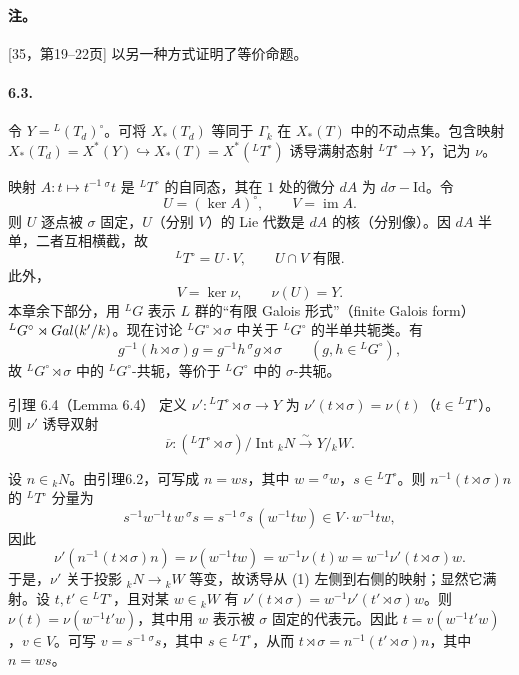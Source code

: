 \paragraph*{注。} [35，第19--22页] 以另一种方式证明了等价命题。

\paragraph*{6.3.} 令 $Y={}^L(T_d)^\circ$。可将 $X_*(T_d)$ 等同于 $\Gamma_k$ 在 $X_*(T)$ 中的不动点集。包含映射 $X_*(T_d)=X^*(Y)\hookrightarrow X_*(T)=X^*({}^LT^\circ)$ 诱导满射态射 ${}^LT^\circ\to Y$，记为 $\nu$。

映射 $A:t\mapsto t^{-1}\,{}^\sigma t$ 是 ${}^LT^\circ$ 的自同态，其在 $1$ 处的微分 $dA$ 为 $d\sigma-\mathrm{Id}$。令
\begin{equation}
 U=(\ker A)^\circ,\qquad V=\operatorname{im}A.\tag{1}
\end{equation}
则 $U$ 逐点被 $\sigma$ 固定，$U$（分别 $V$）的 Lie 代数是 $dA$ 的核（分别像）。因 $dA$ 半单，二者互相横截，故
\begin{equation}
 {}^LT^\circ=U\cdot V,\qquad U\cap V\text{ 有限}.\tag{2}
\end{equation}
此外，
\begin{equation}
 V=\ker\nu,\qquad\nu(U)=Y.\tag{3}
\end{equation}
本章余下部分，用 ${}^LG$ 表示 $L$ 群的“有限 Galois 形式”（finite Galois form）${}^LG^\circ\rtimes Gal(k'/k)$。现在讨论 ${}^LG^\circ\rtimes\sigma$ 中关于 ${}^LG^\circ$ 的半单共轭类。有
\begin{equation}
 g^{-1}(h\rtimes\sigma)g=g^{-1}h\,{}^\sigma g\rtimes\sigma
 \qquad(g,h\in{}^LG^\circ),\tag{4}
\end{equation}
故 ${}^LG^\circ\rtimes\sigma$ 中的 ${}^LG^\circ$-共轭，等价于 ${}^LG^\circ$ 中的 $\sigma$-共轭。

\begin{originaltheorem}{引理 6.4（Lemma 6.4）}
定义 $\nu':{}^LT^\circ\rtimes\sigma\to Y$ 为 $\nu'(t\rtimes\sigma)=\nu(t)$（$t\in{}^LT^\circ$）。则 $\nu'$ 诱导双射
\begin{equation}
 \overline\nu:({}^LT^\circ\rtimes\sigma)/\operatorname{Int}{}_kN\xrightarrow{\sim}Y/{}_kW.\tag{1}
\end{equation}
\end{originaltheorem}
设 $n\in{}_kN$。由引理6.2，可写成 $n=ws$，其中 $w={}^\sigma w$，$s\in{}^LT^\circ$。则 $n^{-1}(t\rtimes\sigma)n$ 的 ${}^LT^\circ$ 分量为
\[
 s^{-1}w^{-1}t\,w\,{}^\sigma s=s^{-1}\,{}^\sigma s\,(w^{-1}tw)\in V\cdot w^{-1}tw,
\]
因此
\[
 \nu'(n^{-1}(t\rtimes\sigma)n)=\nu(w^{-1}tw)
 =w^{-1}\nu(t)w=w^{-1}\nu'(t\rtimes\sigma)w.
\]
于是，$\nu'$ 关于投影 ${}_kN\to{}_kW$ 等变，故诱导从 (1) 左侧到右侧的映射；显然它满射。设 $t,t'\in{}^LT^\circ$，且对某 $w\in{}_kW$ 有 $\nu'(t\rtimes\sigma)=w^{-1}\nu'(t'\rtimes\sigma)w$。则 $\nu(t)=\nu(w^{-1}t'w)$，其中用 $w$ 表示被 $\sigma$ 固定的代表元。因此 $t=v(w^{-1}t'w)$，$v\in V$。可写 $v=s^{-1}\,{}^\sigma s$，其中 $s\in{}^LT^\circ$，从而 $t\rtimes\sigma=n^{-1}(t'\rtimes\sigma)n$，其中 $n=ws$。

